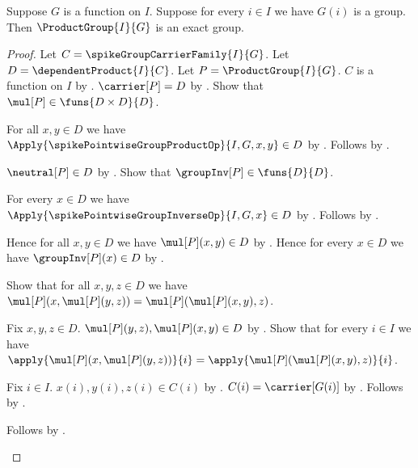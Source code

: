 \begin{theorem}\label{spike_product_group_is_exact}
    Suppose $G$ is a function on $I$.
    Suppose for every $i\in I$ we have $G(i)$ is a group.
    Then $\ProductGroup{I}{G}$ is an exact group.
\end{theorem}
\begin{proof}
    Let $C=\spikeGroupCarrierFamily{I}{G}$.
    Let $D=\dependentProduct{I}{C}$.
    Let $P=\ProductGroup{I}{G}$.
    $C$ is a function on $I$ by
        .
    $\carrier[P]=D$ by .
    Show that $\mul[P]\in\funs{D\times D}{D}$.
    \begin{subproof}
        For all $x,y\in D$ we have
            $\Apply{\spikePointwiseGroupProductOp}{I,G,x,y}\in D$ by
            .
        Follows by
            .
    \end{subproof}
    $\neutral[P]\in D$ by
        .
    Show that $\groupInv[P]\in\funs{D}{D}$.
    \begin{subproof}
        For every $x\in D$ we have
            $\Apply{\spikePointwiseGroupInverseOp}{I,G,x}\in D$ by
            .
        Follows by
            .
    \end{subproof}
    Hence for all $x,y\in D$ we have $\mul[P](x,y)\in D$ by
        .
    Hence for every $x\in D$ we have $\groupInv[P](x)\in D$ by
        .

    Show that for all $x,y,z\in D$ we have
        $\mul[P](x,\mul[P](y,z))=\mul[P](\mul[P](x,y),z)$.
    \begin{subproof}
        Fix $x,y,z\in D$.
        $\mul[P](y,z),\mul[P](x,y)\in D$ by \auto.
        Show that for every $i\in I$ we have
            $\apply{\mul[P](x,\mul[P](y,z))}{i}
                =\apply{\mul[P](\mul[P](x,y),z)}{i}$.
        \begin{subproof}
            Fix $i\in I$.
            $x(i),y(i),z(i)\in C(i)$ by
                .
            $C(i)=\carrier[G(i)]$ by
                .
            Follows by
                .
        \end{subproof}
        Follows by .
    \end{subproof}


\end{proof}
